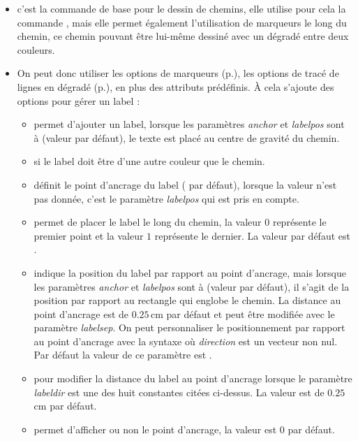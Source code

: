 \begin{itemize}
 \item\desc c'est la commande de base pour le dessin de chemins, elle utilise pour cela la commande , mais elle permet également l'utilisation de marqueurs le long du chemin, ce chemin pouvant être lui-même dessiné avec un dégradé entre deux couleurs.
 \item On peut donc utiliser les options de marqueurs (p.\pageref{marqueurs}), les options de tracé de lignes en dégradé (p.\pageref{gradLines}), en plus des attributs prédéfinis. À cela s'ajoute des options pour gérer un label : \label{optionslabels}
  \begin{itemize}
  \item {} permet d'ajouter un label, lorsque les paramètres \emph{anchor} et \emph{labelpos} sont à  (valeur par défaut), le texte est placé au centre de gravité du chemin.
  \item {} si le label doit être d'une autre couleur que le chemin.
  \item {} définit le point d'ancrage du label ( par défaut), lorsque la valeur n'est pas donnée, c'est le paramètre \emph{labelpos} qui est pris en compte.
  \item {} permet de placer le label le long du chemin, la valeur $0$ représente le premier point et la valeur $1$ représente le dernier. La valeur par défaut est .
  \item {} indique la position du label par rapport au point d'ancrage, mais lorsque les paramètres \emph{anchor} et \emph{labelpos} sont à  (valeur par défaut), il s'agit de la position par rapport au rectangle qui englobe le chemin. La distance au point d'ancrage est de $0.25$\,cm par défaut et peut être modifiée avec le paramètre \emph{labelsep}. On peut personnaliser le positionnement par rapport au point d'ancrage avec la syntaxe  où \emph{direction} est un vecteur non nul. Par défaut la valeur de ce paramètre est .
  \item {} pour modifier la distance du label au point d'ancrage lorsque le paramètre \emph{labeldir} est une des huit constantes citées ci-dessus. La valeur est de $0.25$\,cm par défaut.
  \item {} permet d'afficher ou non le point d'ancrage, la valeur est $0$ par défaut.

\end{itemize}
\end{itemize}
